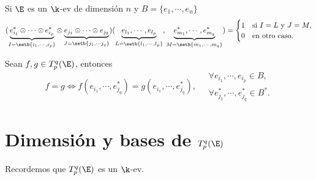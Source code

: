 \begin{obs}
    \label{obs:tens_cero} Si $ \E $ es un $ \k $-ev de dimensión $ n $
    y $ B = \{e_1, \cdots, e_n\} $
    \[
        (\underbrace{e_{i_1}^* \otimes \cdots \otimes e_{i_p}^*}_ {I =
        \setb{i_1, \cdots, i_p}} \otimes \underbrace{e_{j_1} \otimes
        \cdots \otimes e_{j_2}}_ {J = \setb{j_1, \cdots j_q}})(\underbrace
        {e_{l_1}, \cdots, e_{l_p}}_ {L = \setb{l_1, \cdots, l_p}},
        \underbrace{e_{m_1}^*, \cdots, e_{m_q}^*}_ {M = \setb{m_1,
        \cdots, m_q}}) =
        \begin{cases}
            1 & \text{si } I = L \text{ y } J = M, \\
            0 & \text{en otro caso}.
        \end{cases}
    \]
\end{obs}
\begin{obs}
    Sean $ f,g \in T_p^q(\E) $, entonces
    \[
        f=g \iff f(e_{i_1}, \cdots, e_{j_q}^*) = g(e_{i_1}, \cdots, e_{j_q}^*),
        \quad
        \begin{array}{l}
            \forall e_{i_1}, \cdots, e_{i_p} \in B, \\
            \forall e_{j_1}^*, \cdots,e_{j_q}^* \in B^*.
        \end{array}
    \]
\end{obs}

\section{Dimensión y bases de $ T_p^q(\E) $}

Recordemos que $ T_p^q(\E) $ es un $ \k $-ev.

